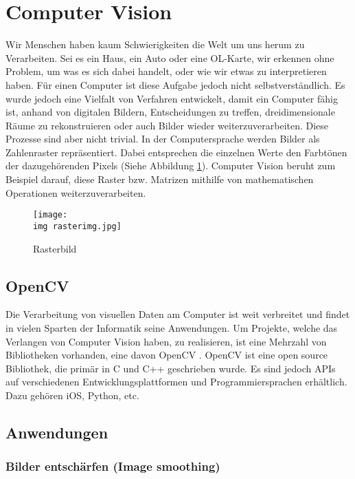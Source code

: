 \section{Computer Vision}

Wir Menschen haben kaum Schwierigkeiten die Welt um uns herum zu Verarbeiten. Sei es ein Haus, ein Auto oder eine OL-Karte, wir erkennen ohne Problem, um was es sich dabei handelt, oder wie wir etwas zu interpretieren haben. Für einen Computer ist diese Aufgabe jedoch nicht selbstverständlich. Es wurde jedoch eine Vielfalt von Verfahren entwickelt, damit ein Computer fähig ist, anhand von digitalen Bildern, Entscheidungen zu treffen, dreidimensionale Räume zu rekonstruieren oder auch Bilder wieder  weiterzuverarbeiten. Diese Prozesse sind aber nicht trivial. In der Computersprache werden Bilder als Zahlenraster repräsentiert. Dabei entsprechen die einzelnen Werte den Farbtönen der dazugehörenden Pixels (Siehe Abbildung \ref{fig:rasterimg}). \cite{computervision_szeliski:1, opencv_bradski_kaehler:1} Computer Vision beruht zum Beispiel darauf, diese Raster bzw. Matrizen mithilfe von mathematischen Operationen weiterzuverarbeiten.

\begin{figure}[hbt]
	\centering
	\texttt{[image: \\img rasterimg.jpg]}
	\caption{Rasterbild}
	\label{fig:rasterimg}
\end{figure}


\subsection{OpenCV}

Die Verarbeitung von visuellen Daten am Computer ist weit verbreitet und findet in vielen Sparten der Informatik seine Anwendungen. Um Projekte, welche das Verlangen von Computer Vision haben, zu realisieren, ist eine Mehrzahl von Bibliotheken vorhanden, eine davon OpenCV \cite{opencv:1}. OpenCV ist eine open source Bibliothek, die primär in C und C++ geschrieben wurde. Es sind jedoch APIs auf verschiedenen Entwicklungsplattformen und Programmiersprachen erhältlich. Dazu gehören iOS, Python, etc. \cite{opencv_bradski_kaehler:1}



\subsection{Anwendungen}

\subsubsection{Bilder entschärfen (Image smoothing)}


